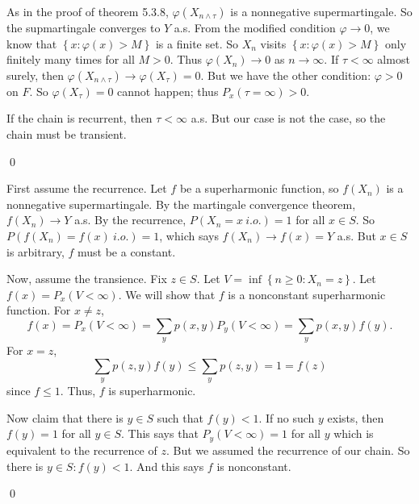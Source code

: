 \begin{problem}[5.3.5] \hfill
	
	As in the proof of theorem 5.3.8, $\varphi(X_{n\wedge \tau})$ is a nonnegative supermartingale.
	So the supmartingale converges to $Y$ a.s.
	From the modified condition $\varphi \rightarrow 0$,
	we know that $\left\{ x: \varphi(x) > M \right\}$ is a finite set.
	So $X_n$ visits $\left\{ x: \varphi(x) > M \right\}$ only finitely many times for all $M>0$.
	Thus $\varphi(X_n) \rightarrow 0$ as $n\rightarrow \infty$.
	If $\tau < \infty$ almost surely, then $\varphi(X_{n\wedge \tau}) \rightarrow \varphi(X_\tau) = 0$.
	But we have the other condition: $\varphi > 0$ on $F$.
	So $\varphi(X_\tau) = 0$ cannot happen; thus $P_x(\tau = \infty) > 0$.

	If the chain is recurrent, then $\tau < \infty$ a.s.
	But our case is not the case, so the chain must be transient.

	\qed
\end{problem}

\begin{problem}[5.3.7] \hfill
	
	First assume the recurrence.
	Let $f$ be a superharmonic function, so $f(X_n)$ is a nonnegative supermartingale.
	By the martingale convergence theorem, $f(X_n) \rightarrow Y$ a.s.
	By the recurrence, $P(X_n = x\ i.o.) = 1$ for all $x \in S$.
	So $P(f(X_n) = f(x)\  i.o.) =1$, which says $f(X_n) \rightarrow f(x) = Y$ a.s.
	But $x\in S$ is arbitrary, $f$ must be a constant.

	Now, assume the transience.
	Fix $z \in S$.
	Let $V = \inf\left\{ n \geq 0: X_n = z \right\}$.
	Let $f(x) = P_x(V < \infty)$.
	We will show that $f$ is a nonconstant superharmonic function.
	For $x \ne z$,
	\[
		f(x) = P_x(V < \infty) = \sum_{y}p(x, y) P_y(V<\infty) = \sum_y p(x, y) f(y).
	\]
	For $x = z$,
	\[
		\sum_y p(z, y) f(y) \leq \sum_y p(z, y) = 1 = f(z)
	\]
	since $f \leq 1$.
	Thus, $f$ is superharmonic.

	Now claim that there is $y \in S$ such that $f(y) < 1$.
	If no such $y$ exists, then $f(y) = 1$ for all $y \in S$.
	This says that $P_y(V<\infty) = 1$ for all $y$ which is equivalent to the recurrence of $z$.
	But we assumed the recurrence of our chain.
	So there is $y\in S : f(y) < 1$.
	And this says $f$ is nonconstant.

	\qed
\end{problem}
